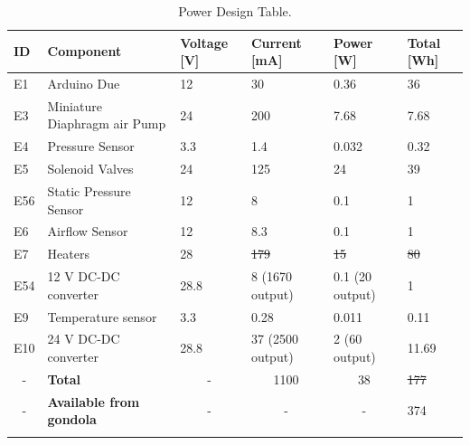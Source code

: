 \documentclass[a4paper,12pt,oneside]{article} %
\providecommand{\DIFaddtex}[1]{{\protect\color{blue}\uwave{#1}}} %
\providecommand{\DIFdeltex}[1]{{\protect\color{red}\sout{#1}}}                      %
\providecommand{\DIFaddbegin}{} %
\providecommand{\DIFaddend}{} %
\providecommand{\DIFdelbegin}{} %
\providecommand{\DIFdelend}{} %
\providecommand{\DIFadd}[1]{\texorpdfstring{\DIFaddtex{#1}}{#1}} %
\providecommand{\DIFdel}[1]{\texorpdfstring{\DIFdeltex{#1}}{}} %
\newcommand{\DIFscaledelfig}{0.5}
\newlength{\DIFdelgraphicswidth} %
\newlength{\DIFdelgraphicsheight} %
\newcommand{\DIFaddincludegraphics}[2][]{{\color{blue}\fbox{\DIFOincludegraphics[#1]{#2}}}} %
\newcommand{\DIFdelincludegraphics}[2][]{%
\sbox{\DIFdelgraphicsbox}{\DIFOincludegraphics[#1]{#2}}%
\settoboxwidth{\DIFdelgraphicswidth}{\DIFdelgraphicsbox} %
\settoboxtotalheight{\DIFdelgraphicsheight}{\DIFdelgraphicsbox} %
\scalebox{\DIFscaledelfig}{%
\parbox[b]{\DIFdelgraphicswidth}{\usebox{\DIFdelgraphicsbox}\\[-\baselineskip] \rule{\DIFdelgraphicswidth}{0em}}\llap{\resizebox{\DIFdelgraphicswidth}{\DIFdelgraphicsheight}{%
\setlength{\unitlength}{\DIFdelgraphicswidth}%
\begin{picture}(1,1)%
\thicklines\linethickness{2pt} %
{\color[rgb]{1,0,0}\put(0,0){\framebox(1,1){}}}%
{\color[rgb]{1,0,0}\put(0,0){\line( 1,1){1}}}%
{\color[rgb]{1,0,0}\put(0,1){\line(1,-1){1}}}%
\end{picture}%
}\hspace*{3pt}}} %
} %
\DeclareRobustCommand{\DIFaddbegin}{\DIFOaddbegin \let\includegraphics\DIFaddincludegraphics} %
\DeclareRobustCommand{\DIFaddend}{\DIFOaddend \let\includegraphics\DIFOincludegraphics} %
\DeclareRobustCommand{\DIFdelbegin}{\DIFOdelbegin \let\includegraphics\DIFdelincludegraphics} %
\DeclareRobustCommand{\DIFdelend}{\DIFOaddend \let\includegraphics\DIFOincludegraphics} %
\begin{document}
\begin{longtable}{|m{}| m{} |m{} |m{}|m{}| m{} |}
\hline
\textbf{ID}             & \textbf{Component}                                                   & \textbf{Voltage {[}V{]}} & \textbf{Current {[}mA{]}} & \textbf{Power {[}W{]}} & \textbf{Total {[}Wh{]}} \\ \hline
E1 & Arduino Due & 12& 30  & 0.36  & 36  \\ \hline
E3 & Miniature Diaphragm air Pump & 24 & 200 & 7.68 & 7.68 \\ \hline
E4  & Pressure Sensor  & 3.3 & 1.4 & 0.032 & 0.32  \\ \hline
E5  & Solenoid Valves & 24 & 125 & 24  & 39 \\ \hline
E56 & Static Pressure Sensor & 12  & 8   & 0.1 & 1 \\ \hline
E6 & Airflow Sensor & 12  & 8.3   & 0.1 & 1 \\ \hline

E7   &  Heaters & 28 & \DIFdelbegin \DIFdel{179  }\DIFdelend \DIFaddbegin \DIFadd{180  }\DIFaddend & \DIFdelbegin \DIFdel{15 }\DIFdelend \DIFaddbegin \DIFadd{21 }\DIFaddend & \DIFdelbegin \DIFdel{80 }\DIFdelend \DIFaddbegin \DIFadd{84 }\DIFaddend \\ \hline
E54  & 12 V DC-DC converter  & 28.8   & 8 (1670 output) & 0.1 (20 output) & 1 \\ \hline
E9  & Temperature sensor & 3.3 & 0.28 & 0.011  & 0.11   \\ \hline




E10  & 24 V DC-DC converter   & 28.8   & 37 (2500 output) & 2 (60 output) & 11.69 \\ \hline
\multicolumn{1}{|c|}{-} & \textbf{Total}                                  & \multicolumn{1}{c|}{-}                      & \multicolumn{1}{c|}{1100}                    & \DIFdelbegin %
\DIFdelend \DIFaddbegin \multicolumn{1}{c|}{38}                 \DIFaddend & \DIFdelbegin \DIFdel{177                                        }\DIFdelend \DIFaddbegin \DIFadd{181                                        }\DIFaddend \\ \hline
\multicolumn{1}{|c|}{-} & \textbf{Available from gondola}                 & \multicolumn{1}{c|}{-}                      & \multicolumn{1}{c|}{-}                       & \multicolumn{1}{c|}{-}                    & 374                                        \\ \hline

\caption{Power Design Table.}
\label{tab:power-design-table}
\end{longtable}
\raggedbottom
\end{document}
